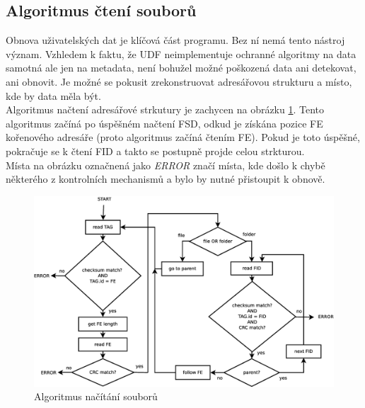 \subsection{Algoritmus čtení souborů}
Obnova uživatelských dat je klíčová část programu. Bez ní nemá tento nástroj význam. Vzhledem k faktu, že UDF neimplementuje ochranné algoritmy na data samotná ale jen na metadata, není bohužel možné poškozená data ani detekovat, ani obnovit. Je možné se pokusit zrekonstruovat adresářovou strukturu a místo, kde by data měla být.\\
Algoritmus načtení adresářové strkutury je zachycen na obrázku \ref{fig:files}. Tento algoritmus začíná po úspěšném načtení FSD, odkud je získána pozice FE kořenového adresáře (proto algoritmus začíná čtením FE). Pokud je toto úspěšné, pokračuje se k čtení FID a takto se postupně projde celou strkturou.\\
Místa na obrázku označnená jako \textit{ERROR} značí místa, kde došlo k chybě některého z kontrolních mechanismů a bylo by nutné přistoupit k obnově. 
\begin{figure}[ht] 
    \centering
    \includegraphics[scale=0.36]{obrazky/files.eps}
    \caption{Algoritmus načítání souborů}
    \label{fig:files}
\end{figure}

